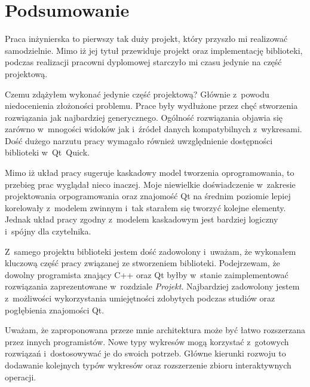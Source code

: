 \chapter{Podsumowanie}
Praca inżynierska to pierwszy tak duży projekt, który przyszło mi realizować samodzielnie. Mimo iż jej tytuł przewiduje projekt oraz implementację biblioteki, podczas realizacji pracowni dyplomowej starczyło mi czasu jedynie na część projektową.

Czemu zdążyłem wykonać jedynie część projektową? Głównie z~powodu niedocenienia złożoności problemu. Prace były wydłużone przez chęć stworzenia rozwiązania jak najbardziej generycznego. Ogólność rozwiązania objawia się zarówno w~mnogości widoków jak i~źródeł danych kompatybilnych z~wykresami. Dość dużego narzutu pracy wymagało również uwzględnienie dostępności biblioteki w~Qt~Quick.

Mimo iż układ pracy sugeruje kaskadowy model tworzenia oprogramowania, to przebieg prac wyglądał nieco inaczej. Moje niewielkie doświadczenie w~zakresie projektowania orpogramowania oraz znajomość Qt na średnim poziomie lepiej korelowały z~modelem zwinnym i~tak starałem się tworzyć kolejne elementy. Jednak układ pracy zgodny z~modelem kaskadowym jest bardziej logiczny i~spójny dla czytelnika.

Z~samego projektu biblioteki jestem dość zadowolony i~uważam, że wykonałem kluczową część pracy związanej ze stworzeniem biblioteki. Podejrzewam, że dowolny programista znający C++ oraz Qt byłby w~stanie zaimplementować rozwiązania zaprezentowane w~rozdziale \textit{Projekt}. Najbardziej zadowolony jestem z~możliwości wykorzystania umiejętności zdobytych podczas studiów oraz pogłębienia znajomości Qt.

Uważam, że zaproponowana przeze mnie architektura może być łatwo rozszerzana przez innych programistów. Nowe typy wykresów mogą korzystać z~gotowych rozwiązań i~dostosowywać je do swoich potrzeb. Główne kierunki rozwoju to dodawanie kolejnych typów wykresów oraz rozszerzenie zbioru interaktywnych operacji.


